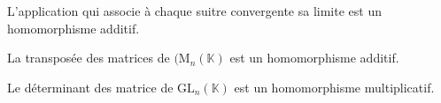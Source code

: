 \begin{Example}{}{}
L'application qui associe à chaque suitre convergente sa limite est un homomorphisme additif.
\end{Example}

\begin{Example}{}
    La transposée des matrices de $(\mathrm{M}_n (\mathbb{K})$ est un homomorphisme additif.


    Le déterminant des matrice de $\mathrm{GL}_n( \mathbb{K})$ est un homomorphisme multiplicatif.

\end{Example}




















































